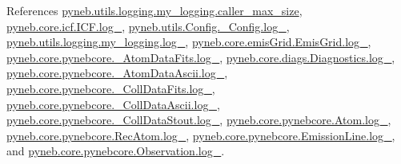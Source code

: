 References \hyperlink{logging_8py_source_l00040}{pyneb.\-utils.\-logging.\-my\-\_\-logging.\-caller\-\_\-max\-\_\-size}, \hyperlink{icf_8py_source_l00015}{pyneb.\-core.\-icf.\-I\-C\-F.\-log\-\_\-}, \hyperlink{_config_8py_source_l00031}{pyneb.\-utils.\-Config.\-\_\-\-Config.\-log\-\_\-}, \hyperlink{logging_8py_source_l00033}{pyneb.\-utils.\-logging.\-my\-\_\-logging.\-log\-\_\-}, \hyperlink{emis_grid_8py_source_l00043}{pyneb.\-core.\-emis\-Grid.\-Emis\-Grid.\-log\-\_\-}, \hyperlink{pynebcore_8py_source_l00087}{pyneb.\-core.\-pynebcore.\-\_\-\-Atom\-Data\-Fits.\-log\-\_\-}, \hyperlink{diags_8py_source_l00168}{pyneb.\-core.\-diags.\-Diagnostics.\-log\-\_\-}, \hyperlink{pynebcore_8py_source_l00308}{pyneb.\-core.\-pynebcore.\-\_\-\-Atom\-Data\-Ascii.\-log\-\_\-}, \hyperlink{pynebcore_8py_source_l00574}{pyneb.\-core.\-pynebcore.\-\_\-\-Coll\-Data\-Fits.\-log\-\_\-}, \hyperlink{pynebcore_8py_source_l00923}{pyneb.\-core.\-pynebcore.\-\_\-\-Coll\-Data\-Ascii.\-log\-\_\-}, \hyperlink{pynebcore_8py_source_l01155}{pyneb.\-core.\-pynebcore.\-\_\-\-Coll\-Data\-Stout.\-log\-\_\-}, \hyperlink{pynebcore_8py_source_l01216}{pyneb.\-core.\-pynebcore.\-Atom.\-log\-\_\-}, \hyperlink{pynebcore_8py_source_l02633}{pyneb.\-core.\-pynebcore.\-Rec\-Atom.\-log\-\_\-}, \hyperlink{pynebcore_8py_source_l03384}{pyneb.\-core.\-pynebcore.\-Emission\-Line.\-log\-\_\-}, and \hyperlink{pynebcore_8py_source_l03540}{pyneb.\-core.\-pynebcore.\-Observation.\-log\-\_\-}.


